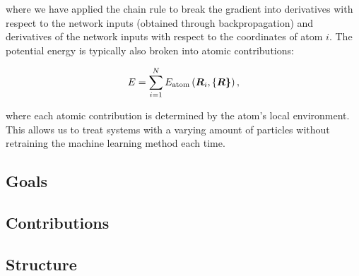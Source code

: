 where we have applied the chain rule to break the gradient
into derivatives with respect to the network inputs (obtained through
backpropagation) and derivatives of the network inputs with
respect to the coordinates of atom $i$.
The potential energy is typically also broken into
atomic contributions:

\begin{equation}
E = \sum_{i=1}^N E_{\text{atom}}\left(\bm{R}_i, \left\{\bm{R\right\}} \right) ,
\end{equation}

where each atomic contribution is determined by the atom's
local environment. This allows us to treat systems with
a varying amount of particles without retraining
the machine learning method each time.

\subsection{Goals}

\subsection{Contributions}

\subsection{Structure}
